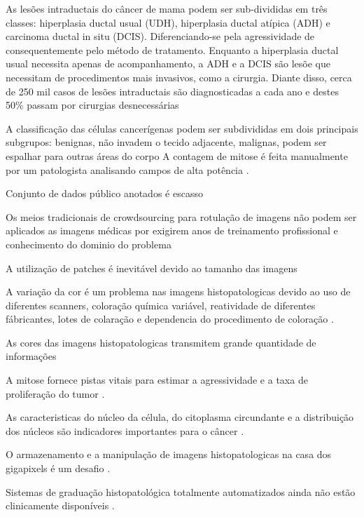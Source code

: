 \documentclass[preprint,12pt,authoryear]{elsarticle}
\begin{document}
As lesões intraductais do câncer de mama podem ser sub-divididas em três classes: hiperplasia ductal usual (UDH), hiperplasia ductal atípica (ADH) e carcinoma ductal in situ (DCIS). Diferenciando-se pela agressividade de consequentemente pelo método de tratamento. Enquanto a hiperplasia ductal usual necessita apenas de acompanhamento, a ADH e a DCIS são lesõe que necessitam de procedimentos mais invasivos, como a cirurgia. Diante disso, cerca de 250 mil casos de lesões intraductais são diagnosticadas a cada ano e destes 50\% passam por cirurgias desnecessárias \cite{DUNDAR2011}


A classificação das células cancerígenas podem ser subdivididas em dois principais subgrupos: benignas, não invadem o tecido adjacente, malignas, podem ser espalhar para outras áreas do corpo \cite{KARTHIGA2018}
A contagem de mitose é feita manualmente por um patologista analisando campos de alta potência \cite{WANG2014}.



Conjunto de dados público anotados é escasso \cite{YAN2019}

Os meios tradicionais de crowdsourcing para rotulação de imagens não podem ser aplicados as imagens médicas por exigirem anos de treinamento profissional e conhecimento do dominio do problema \cite{YAN2019}

A utilização de patches é inevitável devido ao tamanho das imagens \cite{YAN2019}

A variação da cor é um problema nas imagens histopatologicas devido ao uso de diferentes scanners, coloração química variável, reatividade de diferentes fábricantes, lotes de colaração e dependencia do procedimento de coloração \cite{KHAN2014}.



As cores das imagens histopatologicas transmitem grande quantidade de informações \cite{LI2015}



A mitose fornece pistas vitais para estimar a agressividade e a taxa de proliferação do tumor \cite{SAHA2018a}.


As caracteristicas do núcleo da célula, do citoplasma circundante e a distribuição dos núcleos são indicadores importantes para o câncer \cite{ZHENG2017}.

O armazenamento e a manipulação de imagens histopatologicas na casa dos gigapixels é um desafio \cite{GHAZVINIANZANJANI2019}.

Sistemas de graduação histopatológica totalmente automatizados ainda não estão clinicamente disponíveis \cite{BALAZSI2016}.
\end{document}

